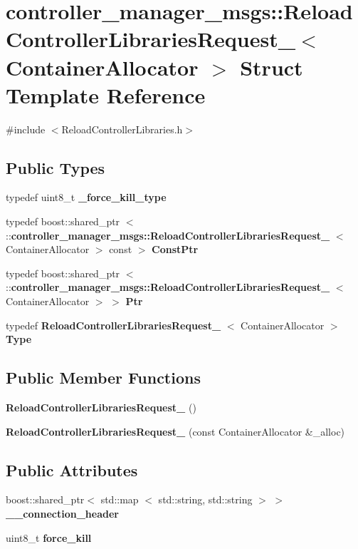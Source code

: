 \section{controller\-\_\-manager\-\_\-msgs\-:\-:\-Reload\-Controller\-Libraries\-Request\-\_\-$<$ \-Container\-Allocator $>$ \-Struct \-Template \-Reference}
\label{structcontroller__manager__msgs_1_1ReloadControllerLibrariesRequest__}


{\ttfamily \#include $<$\-Reload\-Controller\-Libraries.\-h$>$}

\subsection*{\-Public \-Types}
\begin{DoxyCompactItemize}
\item 
typedef uint8\-\_\-t {\bf \-\_\-force\-\_\-kill\-\_\-type}
\item 
typedef boost\-::shared\-\_\-ptr\*
$<$ \-::{\bf controller\-\_\-manager\-\_\-msgs\-::\-Reload\-Controller\-Libraries\-Request\-\_\-}\*
$<$ \-Container\-Allocator $>$ const  $>$ {\bf \-Const\-Ptr}
\item 
typedef boost\-::shared\-\_\-ptr\*
$<$ \-::{\bf controller\-\_\-manager\-\_\-msgs\-::\-Reload\-Controller\-Libraries\-Request\-\_\-}\*
$<$ \-Container\-Allocator $>$ $>$ {\bf \-Ptr}
\item 
typedef \*
{\bf \-Reload\-Controller\-Libraries\-Request\-\_\-}\*
$<$ \-Container\-Allocator $>$ {\bf \-Type}
\end{DoxyCompactItemize}
\subsection*{\-Public \-Member \-Functions}
\begin{DoxyCompactItemize}
\item 
{\bf \-Reload\-Controller\-Libraries\-Request\-\_\-} ()
\item 
{\bf \-Reload\-Controller\-Libraries\-Request\-\_\-} (const \-Container\-Allocator \&\-\_\-alloc)
\end{DoxyCompactItemize}
\subsection*{\-Public \-Attributes}
\begin{DoxyCompactItemize}
\item 
boost\-::shared\-\_\-ptr$<$ std\-::map\*
$<$ std\-::string, std\-::string $>$ $>$ {\bf \-\_\-\-\_\-connection\-\_\-header}
\item 
uint8\-\_\-t {\bf force\-\_\-kill}
\end{DoxyCompactItemize}


